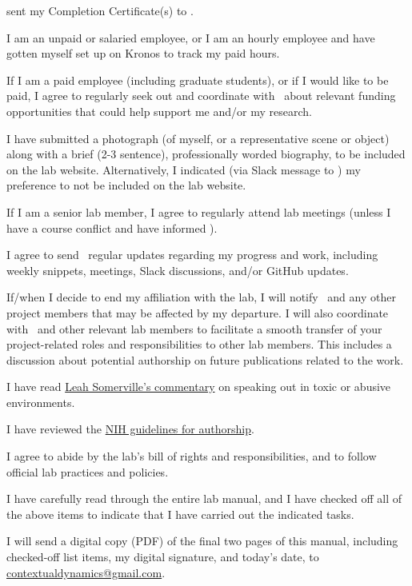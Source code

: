 \documentclass{tufte-book} %
\begin{document}
\begin{todolist}
    sent my Completion Certificate(s) to \coordinator.
  \item I am an unpaid or salaried employee, or I am an hourly
    employee and have gotten myself set up on Kronos to track my paid
    hours.
    \item If I am a paid employee (including graduate students), or if
      I would like to be paid, I agree to regularly seek out and
      coordinate with \director~about relevant funding opportunities
      that could help support me and/or my research.
  \item I have submitted a photograph (of myself, or a representative
    scene or object) along with a brief (2-3 sentence), professionally
    worded biography, to be included on the lab website.
    Alternatively, I indicated (via Slack message to \coordinator) my
    preference to not be included on the lab website.
  \item If I am a senior lab member, I agree to regularly attend lab meetings (unless I have a
    course conflict and have informed \director).
    \item I agree to send \director~regular updates regarding my
      progress and work, including weekly snippets, meetings, Slack
      discussions, and/or GitHub updates.
      \item If/when I decide to end my affiliation with the lab, I
        will notify \director~and any other project members that may
        be affected by my departure.  I will also coordinate with
        \director~and other relevant lab members to facilitate a smooth
        transfer of your project-related roles and responsibilities to
        other lab members.  This includes a discussion about potential
        authorship on future publications related to the work.
  \item I have read
    \href{https://www.sciencemag.org/careers/2018/11/what-can-we-learn-dartmouth}{Leah
      Somerville's commentary} on speaking out in toxic or abusive
    environments.
  \item I have reviewed the
    \href{https://oir.nih.gov/sites/default/files/uploads/sourcebook/documents/ethical_conduct/guidelines-authorship_contributions.pdf}{NIH
      guidelines for authorship}.
  \item I agree to abide by the lab's bill of rights and
    responsibilities, and to follow official lab practices and
    policies.
  \item I have carefully read through the entire lab manual, and I
    have checked off all of the above items to indicate that I have
    carried out the indicated tasks.
  \item I will send a digital copy (PDF) of the final two pages of
    this manual, including checked-off list items, my digital
    signature, and today's date, to
    \href{mailto:contextualdynamics@gmail.com}{contextualdynamics@gmail.com}.
\end{todolist}
\end{document}
